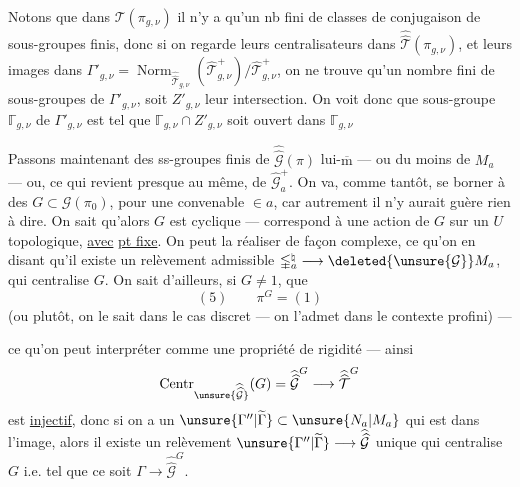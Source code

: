 Notons que dans $\mathcal T(\pi_{g,\nu})$ il n'y a
qu'un nb fini de classes de conjugaison
de sous-groupes finis, donc si on
regarde leurs centralisateurs  dans
$\widehat{\widehat{\mathcal T}}(\pi_{g,\nu})$, et leurs images dans
$\Gamma'_{g,\nu}=\operatorname{Norm}_{\widehat{\widehat{\mathcal T}}_{g,\nu}}(\widehat{\mathcal T}^{+}_{g,\nu})/\widehat{\mathcal T}^{+}_{g,\nu}$, on ne
trouve qu'un nombre fini de sous-groupes
de $\Gamma'_{g,\nu}$, soit $Z'_{g,\nu}$ leur intersection.
On voit donc que  sous-groupe $\mathbb{\Gamma}_{g,\nu}$
de $\Gamma'_{g,\nu}$ est tel que $\mathbb{\Gamma}_{g,\nu}\cap Z'_{g,\nu}$ soit
ouvert dans $\mathbb{\Gamma}_{g,\nu}$


Passons maintenant  des ss-groupes
finis de $\widehat{\widehat{\mathcal G}}(\pi)$ lui-$\overline{\mathrm m}$ --- ou du moins
de $M_a$ --- ou, ce qui revient presque au
même, de $\widehat{\mathcal G}^{+}_a$. On va, comme
tantôt, se borner à des $G\subset\mathcal G(\pi_0)$,
pour une  convenable $\in a$,
car autrement il n'y aurait guère rien à
dire. On sait qu'alors $G$ est
cyclique ---  correspond à une action
de $G$ sur un $U$ topologique, \uline{avec}
\uline{pt fixe}. On peut la réaliser de
façon complexe, ce qu'on  en
disant qu'il existe un relèvement
admissible $\mathbb{\Gamma}_a^{\natural}\longrightarrow\deleted{\unsure{\mathcal G}} M_a$, qui
centralise $G$. On sait d'ailleurs, si
$G\ne1$, que \deleted{$\unsure{\pi}$}
\[
(5)\qquad \pi^G=(1)
\]
(ou plutôt, on le sait dans le cas discret ---
on l'admet dans le contexte profini) ---


ce qu'on peut  interpréter comme une propriété de rigidité --- ainsi
\[
\operatorname{Centr}_{\unsure{\widehat{\widehat{\mathcal G}}}}(G)
=\widehat{\widehat{\mathcal G}}^{G}
\longrightarrow\widehat{\widehat{\mathcal T}}^{G}
\]
est \uline{injectif}, donc si on a un $\unsure{\Gamma''|\widetilde{\Gamma}}\subset\unsure{N_a|M_a}$ qui est dans l'image, alors il existe un relèvement $\unsure{\Gamma''|\widetilde{\Gamma}}\longrightarrow\widehat{\widehat{\mathcal G}}$ unique qui centralise $G$ i.e. tel que ce soit $\Gamma\longrightarrow\widehat{\widehat{\mathcal G}}^{G}$.

